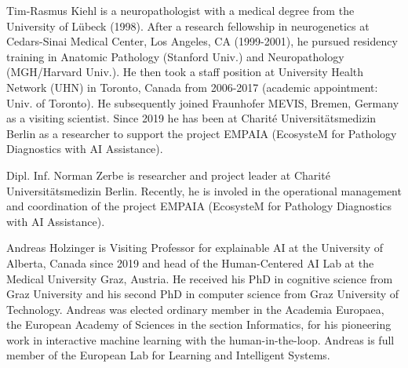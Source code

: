 Tim-Rasmus Kiehl is a neuropathologist with a medical degree from the University of Lübeck (1998). After a research fellowship in neurogenetics at Cedars-Sinai Medical Center, Los Angeles, CA (1999-2001), he pursued residency training in Anatomic Pathology (Stanford Univ.) and Neuropathology (MGH/Harvard Univ.). He then took a staff position at University Health Network (UHN) in Toronto, Canada from 2006-2017 (academic appointment: Univ. of Toronto). He subsequently joined Fraunhofer MEVIS, Bremen, Germany as a visiting scientist. Since 2019 he has been at Charité Universitätsmedizin Berlin as a researcher to support the project EMPAIA (EcosysteM for Pathology Diagnostics with AI Assistance). 

Dipl. Inf. Norman Zerbe is researcher and project leader at Charité Universitätsmedizin Berlin. Recently, he is involed in the operational management and coordination of the project EMPAIA (EcosysteM for Pathology Diagnostics with AI Assistance). 

Andreas Holzinger is Visiting Professor for explainable AI at the University of Alberta, Canada since 2019 and head of the Human-Centered AI Lab at the Medical University Graz, Austria. He received his PhD in cognitive science from Graz University and his second PhD in computer science from Graz University of Technology. Andreas was elected ordinary member in the Academia Europaea, the European Academy of Sciences in the section Informatics, for his pioneering work in interactive machine learning with the human-in-the-loop. Andreas is full member of the European Lab for Learning and Intelligent Systems.


